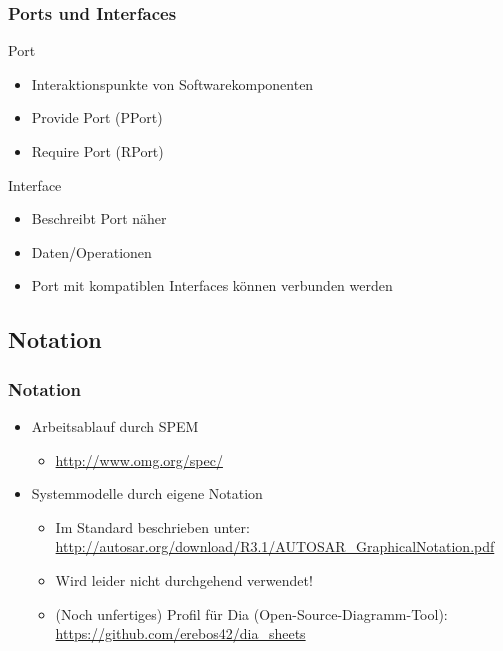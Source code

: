 \documentclass[]{beamer}
\begin{document}
\begin{frame}
\frametitle{Ports und Interfaces}
    \begin{block}{Port}
        \begin{itemize}
            \item Interaktionspunkte von Softwarekomponenten
            \item Provide Port (PPort)
            \item Require Port (RPort)
        \end{itemize}
    \end{block}
    \begin{block}{Interface}
        \begin{itemize}
            \item Beschreibt Port näher
            \item Daten/Operationen
            \item Port mit kompatiblen Interfaces können verbunden werden
        \end{itemize}
    \end{block}
\end{frame}

\subsection{Notation}
\label{sec:Notation}

\begin{frame}
\frametitle{Notation}

    \begin{itemize}
        \item Arbeitsablauf durch SPEM
        \begin{itemize}
            \item \url{http://www.omg.org/spec/}
        \end{itemize}
        \item Systemmodelle durch eigene Notation
        \begin{itemize}
            \item Im Standard beschrieben unter: \url{http://autosar.org/download/R3.1/AUTOSAR_GraphicalNotation.pdf}
            \item Wird leider nicht durchgehend verwendet!
            \item (Noch unfertiges) Profil für Dia (Open-Source-Diagramm-Tool): \url{https://github.com/erebos42/dia_sheets}
        \end{itemize}
    \end{itemize}

\end{frame}
\end{document}
